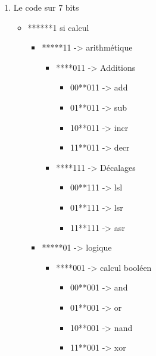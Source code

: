 \documentclass[10pt,a4paper,notitlepage ]{article}
\begin{document}
\begin{enumerate}

\item Le code sur 7 bits

\begin{itemize}

\item ******1 si calcul
\begin{itemize}
\item *****11 -> arithmétique
\begin{itemize}
\item ****011 -> Additions
\begin{itemize}
\item 00**011 -> add
\item 01**011 -> sub
\item 10**011 -> incr
\item 11**011 -> decr
\end{itemize}

\item ****111 -> Décalages
\begin{itemize}
\item 00**111 -> lsl
\item 01**111 -> lsr
\item 11**111 -> asr
\end{itemize}
\end{itemize}

\item *****01 -> logique
\begin{itemize}
\item ****001 -> calcul booléen
\begin{itemize}
\item 00**001 -> and
\item 01**001 -> or
\item 10**001 -> nand
\item 11**001 -> xor
\end{itemize}
\end{itemize}


\end{itemize}
\end{itemize}
\end{enumerate}
\end{document}
